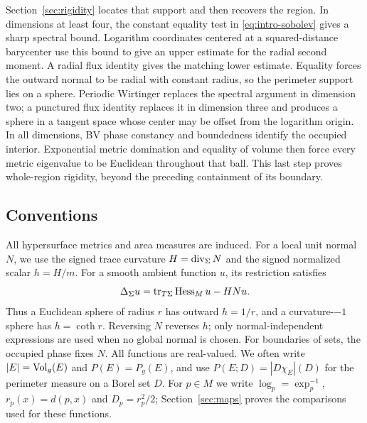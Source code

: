 Section~\ref{sec:rigidity} locates that support and then recovers the
region. In dimensions at least four, the constant equality test in
\eqref{eq:intro-sobolev} gives a sharp spectral bound. Logarithm
coordinates centered at a squared-distance barycenter use this bound
to give an upper estimate for the radial second moment. A radial flux
identity gives the matching lower estimate. Equality forces the
outward normal to be radial with constant radius, so the perimeter
support lies on a sphere. Periodic Wirtinger replaces the spectral
argument in dimension two; a punctured flux identity replaces it in
dimension three and produces a sphere in a tangent space whose center
may be offset from the logarithm origin. In all dimensions, BV phase
constancy and boundedness identify the occupied interior. Exponential
metric domination and equality of volume then force every metric
eigenvalue to be Euclidean throughout that ball. This last step proves
whole-region rigidity, beyond the preceding containment of its boundary.

\subsection{Conventions}

All hypersurface metrics and area measures are induced. For a local
unit normal $N$, we use the signed trace curvature
$H=\operatorname{div}_\Sigma N$ and the signed normalized scalar $h=H/m$.
For a smooth ambient function $u$, its restriction satisfies
\[
 \Delta_\Sigma u=\operatorname{tr}_{T\Sigma}\operatorname{Hess}_M u-HNu.
\]
Thus a Euclidean sphere of radius $r$ has outward $h=1/r$, and a
curvature-$-1$ sphere has $h=\coth r$. Reversing $N$ reverses $h$;
only normal-independent expressions are used when no global normal is
chosen. For boundaries of sets, the occupied phase fixes $N$.
All functions are real-valued. We often write $|E|=\operatorname{Vol}_g(E)$ and
$P(E)=P_g(E)$, and use $P(E;D)=|D\chi_E|(D)$ for the perimeter
measure on a Borel set $D$. For $p\in M$ we write
$\log_p=\exp_p^{-1}$, $r_p(x)=d(p,x)$ and $D_p=r_p^2/2$;
Section~\ref{sec:maps} proves the comparisons used for these functions.
